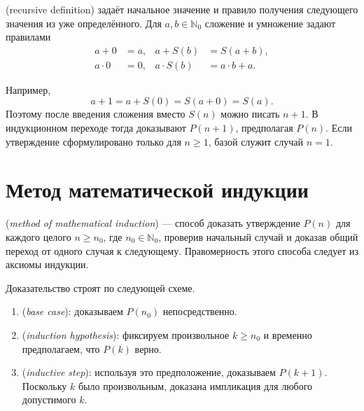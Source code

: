 \begin{definition}
 (recursive definition) задаёт начальное значение
и правило получения следующего значения из уже определённого.
Для \(a,b\in\mathbb N_0\) сложение и умножение задают правилами
\[
\begin{aligned}
a+0&=a, & a+S(b)&=S(a+b),\\
a\cdot0&=0, & a\cdot S(b)&=a\cdot b+a.
\end{aligned}
\]
\end{definition}

Например,
\[
a+1=a+S(0)=S(a+0)=S(a).
\]
Поэтому после введения сложения вместо \(S(n)\) можно писать \(n+1\).
В индукционном переходе тогда доказывают \(P(n+1)\), предполагая \(P(n)\).
Если утверждение сформулировано только для \(n\ge1\), базой служит случай \(n=1\).

\section{Метод математической индукции}

\begin{definition}
 (\emph{method of mathematical induction}) ---
способ доказать утверждение \(P(n)\) для каждого целого \(n\ge n_0\), где
\(n_0\in\mathbb N_0\), проверив начальный случай и доказав общий переход
от одного случая к следующему. Правомерность этого способа следует из аксиомы индукции.
\end{definition}

Доказательство строят по следующей схеме.
\begin{enumerate}[label=\arabic*.,leftmargin=2em,itemsep=5pt]
\item {} (\emph{base case}): доказываем \(P(n_0)\) непосредственно.
\item {} (\emph{induction hypothesis}):
фиксируем произвольное \(k\ge n_0\) и временно предполагаем, что \(P(k)\) верно.
\item {} (\emph{inductive step}):
используя это предположение, доказываем \(P(k+1)\).
Поскольку \(k\) было произвольным, доказана импликация для любого допустимого \(k\).
\end{enumerate}

